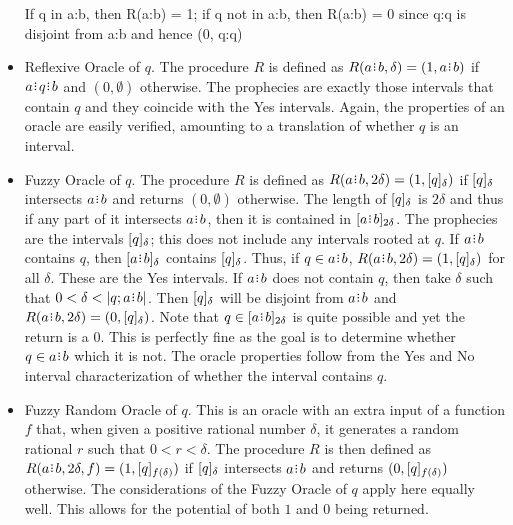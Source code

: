 \documentclass[12pt]{article}
\begin{document}
\begin{itemize}
    If q in a:b, then R(a:b) = 1; if q not in a:b, then R(a:b) = 0 since q:q is disjoint from a:b and hence (0, q:q)
    \item Reflexive Oracle of $q$. The procedure $R$ is defined as $R(a\rint b, \delta) = (1, a\rint b)$ if $a\rint q \rint b$ and $(0, \emptyset)$ otherwise. The prophecies are exactly those intervals that contain $q$ and they coincide with the Yes intervals. Again, the properties of an oracle are easily verified, amounting to a translation of whether $q$ is an interval. 
    \item Fuzzy Oracle of $q$. The procedure $R$ is defined as $R(a\rint b, 2\delta) = (1, \halo{q})$ if $\halo{q}$ intersects $a\rint b$ and returns $(0, \emptyset)$ otherwise. The length of $\halo{q}$ is $2\delta$ and thus if any part of it intersects $a \rint b$, then it is contained in $\halo[2\delta]{a \rint b}$. The prophecies are the intervals $\halo{q}$; this does not include any intervals rooted at $q$. If $a \rint b$ contains $q$, then $\halo{a \rint b}$ contains $\halo{q}$. Thus, if $q \in a \rint b$, $R(a \rint b, 2\delta) = (1, \halo{q})$ for all $\delta$. These are the Yes intervals. If $a \rint b$ does not contain $q$, then take $\delta$ such that $0 < \delta < |q; a \rint b|$. Then $\halo{q}$ will be disjoint from $a \rint b$ and $R(a \rint b, 2\delta) = (0, \halo{q})$. Note that $q \in \halo[2\delta]{a \rint b}$ is quite possible and yet the return is a $0$. This is perfectly fine as the goal is to determine whether $q \in a \rint b$ which it is not. The oracle properties follow from the Yes and No interval characterization of whether the interval contains $q$. 
    \item Fuzzy Random Oracle of $q$. This is an oracle with an extra input of a function $f$ that, when given a positive rational number $\delta$, it generates a random rational $r$ such that $0 < r < \delta$. The procedure $R$ is then defined as $R(a\rint b, 2\delta, f) = (1, \halo[f(\delta)]{q})$ if $\halo{q}$ intersects $a\rint b$ and returns $(0, \halo[f(\delta)]{q})$ otherwise. The considerations of the Fuzzy Oracle of $q$ apply here equally well. This allows for the potential of both $1$ and $0$ being returned. 

\end{itemize}
\end{document}

